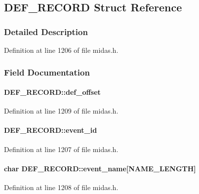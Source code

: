 \subsection{DEF\_\-RECORD Struct Reference}
\label{structDEF__RECORD}


\subsubsection{Detailed Description}


Definition at line 1206 of file midas.h.

\subsubsection{Field Documentation}
\paragraph[{def\_\-offset}]{ {\bf DEF\_\-RECORD::def\_\-offset}}\hfill\label{structDEF__RECORD_a3368ac2be8ed74559ed9ef115756f5e7}


Definition at line 1209 of file midas.h.
\paragraph[{event\_\-id}]{ {\bf DEF\_\-RECORD::event\_\-id}}\hfill\label{structDEF__RECORD_a9d9787264de717f2512af5e7d48e5a32}


Definition at line 1207 of file midas.h.
\paragraph[{event\_\-name}]{\setlength{\rightskip}{0pt plus 5cm}char {\bf DEF\_\-RECORD::event\_\-name}\mbox{[}NAME\_\-LENGTH\mbox{]}}\hfill\label{structDEF__RECORD_ad4fdebc35644bab90bbe3164176690cf}


Definition at line 1208 of file midas.h.